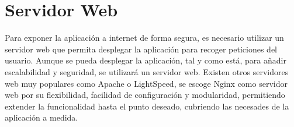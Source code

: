 \section{Servidor Web}
Para exponer la aplicación a internet de forma segura, es necesario utilizar un servidor web que permita desplegar la aplicación para recoger peticiones del usuario. Aunque se pueda desplegar la aplicación, tal y como está, para añadir escalabilidad y seguridad, se utilizará un servidor web. Existen otros servidores web muy populares como Apache o LightSpeed, se escoge Nginx como servidor web por su flexibilidad, facilidad de configuración y modularidad, permitiendo extender la funcionalidad hasta el punto deseado, cubriendo las necesades de la aplicación a medida.